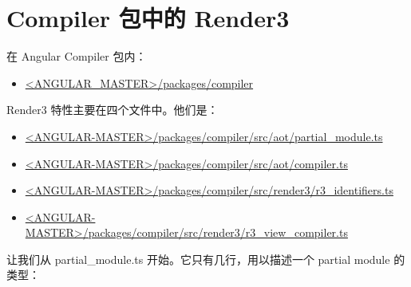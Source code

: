 \section{Compiler 包中的 Render3}


在 Angular Compiler 包内：

\begin{itemize}
      \item \href{https://github.com/angular/angular/tree/master/packages/compiler/}
            {<ANGULAR\_MASTER>/packages/compiler}
\end{itemize}


Render3 特性主要在四个文件中。他们是：

\begin{itemize}
      \item \href{https://github.com/angular/angular/blob/master/packages/compiler/src/aot/partial_module.ts}
            {<ANGULAR-MASTER>/packages/compiler/src/aot/partial\_module.ts}
      \item \href{https://github.com/angular/angular/blob/master/packages/compiler/src/aot/compiler.ts}
            {<ANGULAR-MASTER>/packages/compiler/src/aot/compiler.ts}
      \item \href{https://github.com/angular/angular/blob/master/packages/compiler/src/render3/r3_identifiers.ts}
            {<ANGULAR-MASTER>/packages/compiler/src/render3/r3\_identifiers.ts}
      \item \href{https://github.com/angular/angular/blob/master/packages/compiler/src/render3/r3_view_compiler.ts}
            {<ANGULAR-MASTER>/packages/compiler/src/render3/r3\_view\_compiler.ts}
\end{itemize}


让我们从 partial\_module.ts 开始。它只有几行，用以描述一个 partial module 的类型：




